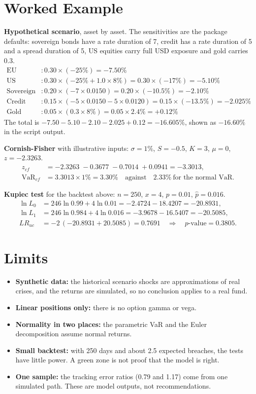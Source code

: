 \documentclass[11pt,a4paper]{article}
\begin{document}
\section{Worked Example}
\textbf{Hypothetical scenario}, asset by asset. The sensitivities are the package defaults: sovereign bonds have a rate duration of 7, credit has a rate duration of 5 and a spread duration of 5, US equities carry full USD exposure and gold carries 0.3.
\begin{align*}
\text{EU equities}&: 0.30\times(-25\%) = -7.50\%\\
\text{US equities}&: 0.30\times(-25\%+1.0\times 8\%) = 0.30\times(-17\%) = -5.10\%\\
\text{Sovereign}&: 0.20\times(-7\times 0.0150) = 0.20\times(-10.5\%) = -2.10\%\\
\text{Credit}&: 0.15\times(-5\times 0.0150 - 5\times 0.0120) = 0.15\times(-13.5\%) = -2.025\%\\
\text{Gold}&: 0.05\times(0.3\times 8\%) = 0.05\times 2.4\% = +0.12\%
\end{align*}
The total is $-7.50-5.10-2.10-2.025+0.12=-16.605\%$, shown as $-16.60\%$ in the script output.

\textbf{Cornish-Fisher} with illustrative inputs: $\sigma=1\%$, $S=-0.5$, $K=3$, $\mu=0$, $z=-2.3263$.
\begin{align*}
z_{cf} &= -2.3263\;-0.3677\;-0.7014\;+0.0941 = -3.3013,\\
\mathrm{VaR}_{cf} &= 3.3013\times 1\% = 3.30\%\quad\text{against}\quad 2.33\%\ \text{for the normal VaR.}
\end{align*}

\textbf{Kupiec test} for the backtest above: $n=250$, $x=4$, $p=0.01$, $\hat p=0.016$.
\begin{align*}
\ln L_0 &= 246\ln 0.99+4\ln 0.01 = -2.4724-18.4207=-20.8931,\\
\ln L_1 &= 246\ln 0.984+4\ln 0.016 = -3.9678-16.5407=-20.5085,\\
LR_{uc} &= -2\,(-20.8931+20.5085)=0.7691\quad\Rightarrow\quad p\text{-value}=0.3805 .
\end{align*}

\section{Limits}
\begin{itemize}
\item \textbf{Synthetic data:} the historical scenario shocks are approximations of real crises, and the returns are simulated, so no conclusion applies to a real fund.
\item \textbf{Linear positions only:} there is no option gamma or vega.
\item \textbf{Normality in two places:} the parametric VaR and the Euler decomposition assume normal returns.
\item \textbf{Small backtest:} with 250 days and about 2.5 expected breaches, the tests have little power. A green zone is not proof that the model is right.
\item \textbf{One sample:} the tracking error ratios (0.79 and 1.17) come from one simulated path. These are model outputs, not recommendations.
\end{itemize}
\end{document}
